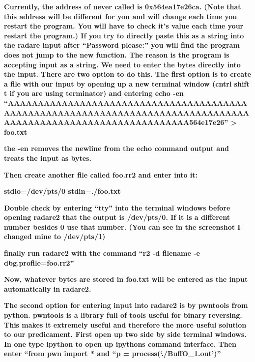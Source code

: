 \documentclass[letterpaper]{article}
\newcommand{\sitfig}[3]{
\begin{figure}[H]
\centering
\makebox[\textwidth][c]{
#2
}
\label{#1}
\end{figure}
}
\newcommand{\sitgfx}[4][scale=1.0]{
\sitfig{#3}{\texttt{[image: \#2]}}{#4}
}
\begin{document}
  
\sitgfx[width=5.8335in,height=3.6457in]{FINALWORKINGDOCFORMERLYPRECURSOR-img096.png}{fig:unk}{TODO CAPTION}
 

\textbf{Currently, the address of never called is 0x564ea17e26ca. (Note that this address will be different for you and
will change each time you restart the program. You will have to check it's value each time your restart the program.)
If you try to directly paste this as a string into the radare input after ``Password please:'' you will find the
program does not jump to the new function. The reason is the program is accepting input as a string. We need to enter
the bytes directly into the input. There are two option to do this. The first option is to create a file with our input
by opening up a new terminal window (cntrl shift t if you are using terminator) and entering echo -en
``AAAAAAAAAAAAAAAAAAAAAAAAAAAAAAAAAAAAAAAAAAAAAAAAAAAAAAAAAAAAAAAAAAAAAAAAAAAAAAAAAAAAAAAAAAAAAAAAAAAAAAAAAAAAAAAA564e17e26''
{\textgreater} foo.txt}

\textbf{the -en removes the newline from the echo command output and treats the input as bytes.}

\textbf{Then create another file called foo.rr2 and enter into it:}

\textbf{stdio=/dev/pts/0\newline
stdin=./foo.txt}

\textbf{Double check by entering ``tty'' into the terminal windows before opening radare2 that the output is /dev/pts/0.
If it is a different number besides 0 use that number. (You can see in the screenshot I changed mine to /dev/pts/1)}

\textbf{finally run radare2 with the command ``r2 -d filename -e dbg.profile=foo.rr2''}

\textbf{Now, whatever bytes are stored in foo.txt will be entered as the input automatically in radare2.}

  
\sitgfx[width=5.8335in,height=3.6457in]{FINALWORKINGDOCFORMERLYPRECURSOR-img097.png}{fig:unk}{TODO CAPTION}
 \textbf{ }

\textbf{The second option for entering input into radare2 is by pwntools from python. pwntools is a library full of
tools useful for binary reversing. This makes it extremely useful and therefore the more useful solution to our
predicament.\newline
First open up two side by side terminal windows. In one type ipython to open up ipythons command interface. Then enter
``from pwn import *{\textquotedbl} and ``p = process(`./BuffO\_1.out')''}
\end{document}
